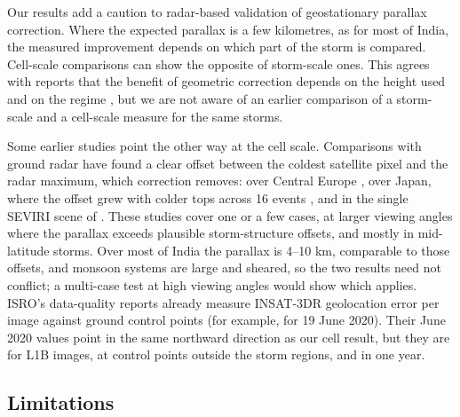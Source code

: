 Our results add a caution to radar-based validation of geostationary parallax correction. Where the expected parallax is a few kilometres, as for most of India, the measured improvement depends on which part of the storm is compared. Cell-scale comparisons can show the opposite of storm-scale ones. This agrees with reports that the benefit of geometric correction depends on the height used and on the regime \citep{wiltink2025,monsalve2026}, but we are not aware of an earlier comparison of a storm-scale and a cell-scale measure for the same storms.

Some earlier studies point the other way at the cell scale. Comparisons with ground radar have found a clear offset between the coldest satellite pixel and the radar maximum, which correction removes: over Central Europe \citep{radova2008}, over Japan, where the offset grew with colder tops across 16 events \citep{harjupa2017}, and in the single SEVIRI scene of \citet{bielinski2020}. These studies cover one or a few cases, at larger viewing angles where the parallax exceeds plausible storm-structure offsets, and mostly in mid-latitude storms. Over most of India the parallax is 4--10 km, comparable to those offsets, and monsoon systems are large and sheared, so the two results need not conflict; a multi-case test at high viewing angles would show which applies. ISRO's data-quality reports \citep{mosdac_dqe2020} already measure INSAT-3DR geolocation error per image against ground control points (for example, for 19 June 2020). Their June 2020 values point in the same northward direction as our cell result, but they are for L1B images, at control points outside the storm regions, and in one year.

\subsection{Limitations}\label{sec:6.7}

